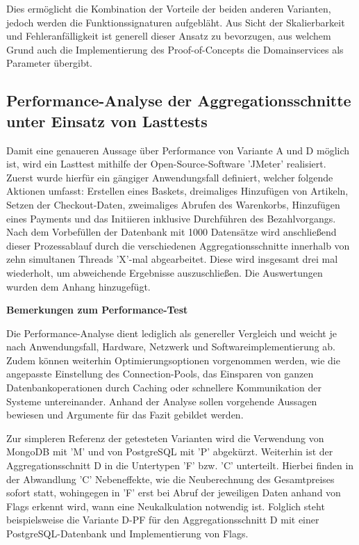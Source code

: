 Dies ermöglicht die Kombination der Vorteile der beiden anderen Varianten, jedoch werden die Funktionssignaturen aufgebläht. Aus Sicht der Skalierbarkeit und Fehleranfälligkeit ist generell dieser Ansatz zu bevorzugen, aus welchem Grund auch die Implementierung des Proof-of-Concepts die Domainservices als Parameter übergibt.

\subsection{Performance-Analyse der Aggregationsschnitte unter Einsatz von Lasttests}

Damit eine genaueren Aussage über Performance von Variante A und D möglich ist, wird ein Lasttest mithilfe der Open-Source-Software 'JMeter' realisiert. Zuerst wurde hierfür ein gängiger Anwendungsfall definiert, welcher folgende Aktionen umfasst: Erstellen eines Baskets, dreimaliges Hinzufügen von Artikeln, Setzen der Checkout-Daten, zweimaliges Abrufen des Warenkorbs, Hinzufügen eines Payments und das Initiieren inklusive Durchführen des Bezahlvorgangs. Nach dem Vorbefüllen der Datenbank mit 1000 Datensätze wird anschließend dieser Prozessablauf durch die verschiedenen Aggregationsschnitte innerhalb von zehn simultanen Threads 'X'-mal abgearbeitet. Diese wird insgesamt drei mal wiederholt, um abweichende Ergebnisse auszuschließen. Die Auswertungen wurden dem Anhang hinzugefügt.


\textbf{Bemerkungen zum Performance-Test}

Die Performance-Analyse dient lediglich als genereller Vergleich und weicht je nach Anwendungsfall, Hardware, Netzwerk und Softwareimplementierung ab. Zudem können weiterhin Optimierungsoptionen vorgenommen werden, wie die angepasste Einstellung des Connection-Pools, das Einsparen von ganzen Datenbankoperationen durch Caching oder schnellere Kommunikation der Systeme untereinander. Anhand der Analyse sollen vorgehende Aussagen bewiesen und Argumente für das Fazit gebildet werden.

Zur simpleren Referenz der getesteten Varianten wird die Verwendung von MongoDB mit 'M' und von PostgreSQL mit 'P' abgekürzt. Weiterhin ist der Aggregationsschnitt D in die Untertypen 'F' bzw. 'C' unterteilt. Hierbei finden in der Abwandlung 'C' Nebeneffekte, wie die Neuberechnung des Gesamtpreises sofort statt, wohingegen in 'F' erst bei Abruf der jeweiligen Daten anhand von Flags erkennt wird, wann eine Neukalkulation notwendig ist. Folglich steht beispielsweise die Variante D-PF für den Aggregationsschnitt D mit einer PostgreSQL-Datenbank und Implementierung von Flags.

